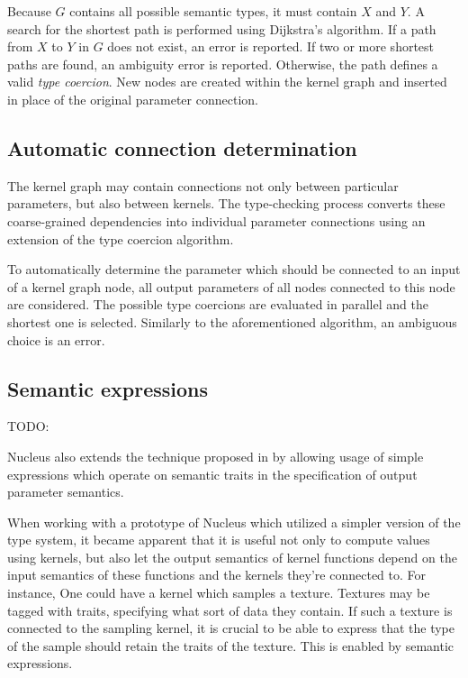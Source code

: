 Because $G$ contains all possible semantic types, it must contain $X$ and $Y$. A search for the shortest path is performed using Dijkstra's algorithm. If a path from $X$ to $Y$ in $G$ does not exist, an error is reported. If two or more shortest paths are found, an ambiguity error is reported. Otherwise, the path defines a valid \emph{type coercion}. New nodes are created within the kernel graph and inserted in place of the original parameter connection.

	
\subsection{Automatic connection determination}

The kernel graph may contain connections not only between particular parameters, but also between kernels. The type-checking process converts these coarse-grained dependencies into individual parameter connections using an extension of the type coercion algorithm.

To automatically determine the parameter which should be connected to an input of a kernel graph node, all output parameters of all nodes connected to this node are considered. The possible type coercions are evaluated in parallel and the shortest one is selected. Similarly to the aforementioned algorithm, an ambiguous choice is an error.


\subsection{Semantic expressions}

TODO:

Nucleus also extends the technique proposed in \cite{mcguire2006shadetrees} by allowing usage of simple expressions which operate on semantic traits in the specification of output parameter semantics.

When working with a prototype of Nucleus which utilized a simpler version of the type system, it became apparent that it is useful not only to compute values using kernels, but also let the output semantics of kernel functions depend on the input semantics of these functions and the kernels they're connected to. For instance, One could have a kernel which samples a texture. Textures may be tagged with traits, specifying what sort of data they contain. If such a texture is connected to the sampling kernel, it is crucial to be able to express that the type of the sample should retain the traits of the texture. This is enabled by semantic expressions.

